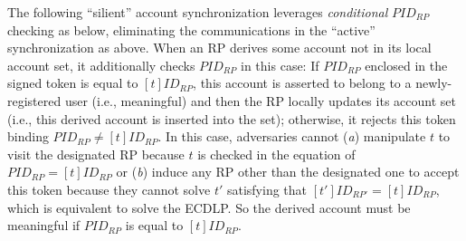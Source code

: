 The following ``silient'' account synchronization
     leverages \emph{conditional} $PID_{RP}$ checking as below,
eliminating the communications in the ``active'' synchronization as above.
When an RP derives some account not in its local account set,
    it additionally checks $PID_{RP}$ in this case:
     If $PID_{RP}$ enclosed in the signed token is equal to $[t]ID_{RP}$,
                this account is asserted to belong to a newly-registered user (i.e., meaningful)
                and then the RP locally updates its account set (i.e., this derived account is inserted into the set);
    otherwise, it rejects this token binding $PID_{RP} \neq [t]ID_{RP}$.
In this case, adversaries cannot (\emph{a}) manipulate $t$ to visit the designated RP because $t$ is checked in the equation of $PID_{RP} = [t]ID_{RP}$ 
 or (\emph{b}) induce any RP other than the designated one to accept this token
    because they cannot solve $t'$ satisfying that $[t']ID_{RP'} = [t]ID_{RP}$, which is equivalent to solve the ECDLP.
So the derived account must be meaningful if $PID_{RP}$ is equal to $[t]ID_{RP}$.



